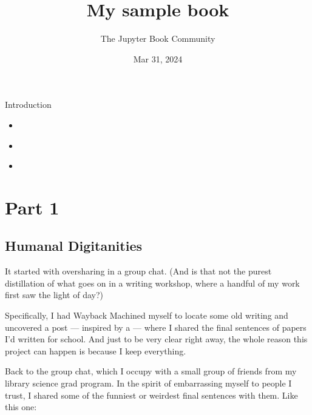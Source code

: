 \documentclass[letterpaper,10pt,english]{jupyterBook}
\title{My sample book}
\date{Mar 31, 2024}
\author{The Jupyter Book Community}
\begin{document}
\pagestyle{empty}
\sphinxmaketitle
\pagestyle{plain}
\sphinxtableofcontents
\pagestyle{normal}
\label{\detokenize{intro::doc}}


\sphinxAtStartPar
Introduction
\begin{itemize}
\item {} 
\sphinxAtStartPar
{\hyperref[\detokenize{part1::doc}]{}}

\item {} 
\sphinxAtStartPar
{\hyperref[\detokenize{part2::doc}]{}}

\item {} 
\sphinxAtStartPar
{\hyperref[\detokenize{part3::doc}]{}}

\end{itemize}

\sphinxstepscope


\chapter{Part 1}
\label{\detokenize{part1:part-1}}\label{\detokenize{part1::doc}}

\section{Humanal Digitanities}
\label{\detokenize{part1:humanal-digitanities}}
\sphinxAtStartPar
{}

\sphinxAtStartPar
It started with oversharing in a group chat. (And is that not the purest distillation of what goes on in a writing workshop, where a handful of my work first saw the light of day?)

\sphinxAtStartPar
Specifically, I had Wayback Machined myself to locate some old writing and uncovered a post — inspired by a  — where I shared the final sentences of papers I’d written for school. And just to be very clear right away, the whole reason this project can happen is because I keep everything.

\sphinxAtStartPar
Back to the group chat, which I occupy with a small group of friends from my library science grad program. In the spirit of embarrassing myself to people I trust, I shared some of the funniest or weirdest final sentences with them. Like this one:

\sphinxAtStartPar
{}
\end{document}
